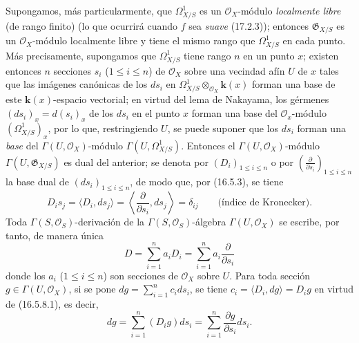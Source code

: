 \begin{env}[16.5.8]
\label{IV.16.5.8}
Supongamos, más particularmente, que $\varOmega_{X/S}^1$ es un
$\mathcal{O}_X$-módulo \emph{localmente libre} (de rango finito) (lo que ocurrirá
cuando $f$ sea \emph{suave} (17.2.3)); entonces $\mathfrak{G}_{X/S}$ es un
$\mathcal{O}_X$-módulo localmente libre y tiene el mismo rango que $\varOmega_{X/S}^1$
en cada punto. Más precisamente, supongamos que $\varOmega_{X/S}^1$ tiene
rango $n$ en un punto $x$; existen entonces $n$ secciones $s_i$ ($1\leq i\leq n$)
de $\mathcal{O}_X$ sobre una vecindad afín $U$ de $x$ tales que las
imágenes canónicas de los $ds_i$ en
$\varOmega_{X/S}^1\otimes_{\mathcal{O}_X}\boldsymbol{k}(x)$ forman una base de este
$\boldsymbol{k}(x)$-espacio vectorial; en virtud del lema de Nakayama, los gérmenes
$(ds_i)_x=d(s_i)_x$ de los $ds_i$ en el punto $x$ forman una base del
$\mathcal{O}_x$-módulo $(\varOmega_{X/S}^1)_x$, por lo que, restringiendo $U$, se
puede suponer que los $ds_i$ forman una \emph{base} del
$\Gamma(U,\mathcal{O}_X)$-módulo $\Gamma(U,\varOmega_{X/S}^1)$. Entonces el
$\Gamma(U,\mathcal{O}_X)$-módulo $\Gamma(U,\mathfrak{G}_{X/S})$ es dual del
anterior; se denota por $(D_i)_{1\leq i\leq n}$ o por
$\left(\frac{\partial}{\partial s_i}\right)_{1\leq i\leq n}$ la base dual de
$(ds_i)_{1\leq i\leq n}$, de modo que, por (16.5.3), se tiene
\[
  D_is_j=\langle D_i,ds_j\rangle
  =\left\langle\frac{\partial}{\partial s_i},ds_j\right\rangle
  =\delta_{ij}\qquad\text{(índice de Kronecker).}
  \tag{16.5.8.1}
  \label{IV.16.5.8.1}
\]
Toda $\Gamma(S,\mathcal{O}_S)$-derivación de la
$\Gamma(S,\mathcal{O}_S)$-álgebra $\Gamma(U,\mathcal{O}_X)$ se escribe, por tanto,
de manera única
\[
  D=\sum_{i=1}^n a_iD_i=\sum_{i=1}^n a_i\frac{\partial}{\partial s_i}
\]
donde los $a_i$ ($1\leq i\leq n$) son secciones de $\mathcal{O}_X$ sobre
$U$. Para toda sección $g\in\Gamma(U,\mathcal{O}_X)$, si se pone
$dg=\sum_{i=1}^n c_i ds_i$, se tiene
$c_i=\langle D_i,dg\rangle=D_ig$ en virtud de (16.5.8.1), es decir,
\[
  dg=\sum_{i=1}^n(D_ig)ds_i
  =\sum_{i=1}^n\frac{\partial g}{\partial s_i}ds_i.
  \tag{16.5.8.2}
  \label{IV.16.5.8.2}
\]
\end{env}


